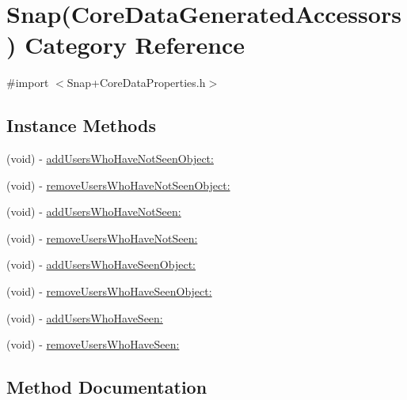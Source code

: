 \hypertarget{category_snap_07_core_data_generated_accessors_08}{}\section{Snap(Core\+Data\+Generated\+Accessors) Category Reference}
\label{category_snap_07_core_data_generated_accessors_08}


{\ttfamily \#import $<$Snap+\+Core\+Data\+Properties.\+h$>$}

\subsection*{Instance Methods}
\begin{DoxyCompactItemize}
\item 
(void) -\/ \hyperlink{category_snap_07_core_data_generated_accessors_08_a857bdb8ecd8f9e24445e64fd8279a126}{add\+Users\+Who\+Have\+Not\+Seen\+Object\+:}
\item 
(void) -\/ \hyperlink{category_snap_07_core_data_generated_accessors_08_a05c43e998f06072a2768e7db4b34a04d}{remove\+Users\+Who\+Have\+Not\+Seen\+Object\+:}
\item 
(void) -\/ \hyperlink{category_snap_07_core_data_generated_accessors_08_a76ddef740df9f189a1b411c93efdd593}{add\+Users\+Who\+Have\+Not\+Seen\+:}
\item 
(void) -\/ \hyperlink{category_snap_07_core_data_generated_accessors_08_aab479d17ca768b4132fbb78faded55fb}{remove\+Users\+Who\+Have\+Not\+Seen\+:}
\item 
(void) -\/ \hyperlink{category_snap_07_core_data_generated_accessors_08_a6841f827b13abc833d3ec7c40c522a1b}{add\+Users\+Who\+Have\+Seen\+Object\+:}
\item 
(void) -\/ \hyperlink{category_snap_07_core_data_generated_accessors_08_ab97c4c0a0f132f6f420ac3127dcd9142}{remove\+Users\+Who\+Have\+Seen\+Object\+:}
\item 
(void) -\/ \hyperlink{category_snap_07_core_data_generated_accessors_08_a855a2e43572cd214251230b2a0612421}{add\+Users\+Who\+Have\+Seen\+:}
\item 
(void) -\/ \hyperlink{category_snap_07_core_data_generated_accessors_08_af4fa1e8b7b4cdd429c312312704b61ab}{remove\+Users\+Who\+Have\+Seen\+:}
\end{DoxyCompactItemize}


\subsection{Method Documentation}
\hypertarget{category_snap_07_core_data_generated_accessors_08_a76ddef740df9f189a1b411c93efdd593}{}\label{category_snap_07_core_data_generated_accessors_08_a76ddef740df9f189a1b411c93efdd593} 
